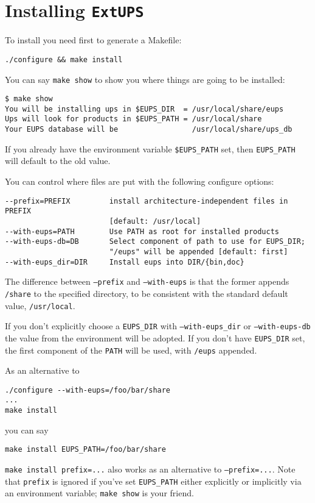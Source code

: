 \documentclass{article}
\newcommand{\code}[1]{\texttt{#1}}
\newcommand{\eups}{\code{ExtUPS}}
\begin{document}
\section{Installing \eups{}}
  
  To install you need first to generate a Makefile:
\begin{verbatim}
./configure && make install
\end{verbatim}

You can say \code{make show} to show you where things are
going to be installed:
\begin{verbatim}
$ make show
You will be installing ups in $EUPS_DIR  = /usr/local/share/eups
Ups will look for products in $EUPS_PATH = /usr/local/share
Your EUPS database will be                 /usr/local/share/ups_db
\end{verbatim}				%
If you already have the environment variable \code{\$EUPS\_PATH} set,
then \code{EUPS\_PATH} will default to the old value.

You can control where files are put with the following configure options:
\begin{verbatim}
--prefix=PREFIX         install architecture-independent files in PREFIX
                        [default: /usr/local]
--with-eups=PATH        Use PATH as root for installed products
--with-eups-db=DB       Select component of path to use for EUPS_DIR;
                        "/eups" will be appended [default: first]
--with-eups_dir=DIR     Install eups into DIR/{bin,doc}
\end{verbatim}
The difference between \code{--prefix} and \code{--with-eups}
is that the former appends \code{/share} to the specified directory, to
be consistent with the standard default value, \code{/usr/local}.

If you don't explicitly choose a \code{EUPS\_DIR} with
\code{--with-eups\_dir} or \code{--with-eups-db} the value from the
environment will be adopted. If you don't have \code{EUPS\_DIR} set,
the first component of the \code{PATH} will be used, with \code{/eups}
appended.
  
As an alternative to
\begin{verbatim}
./configure --with-eups=/foo/bar/share
...
make install
\end{verbatim}
you can say
\begin{verbatim}
make install EUPS_PATH=/foo/bar/share
\end{verbatim}
\code{make install prefix=...} also works as an alternative to \code{--prefix=...}.
Note that \code{prefix} is ignored if you've set \code{EUPS\_PATH} either explicitly
or implicitly via an environment variable; \code{make show} is your friend.
\end{document}
